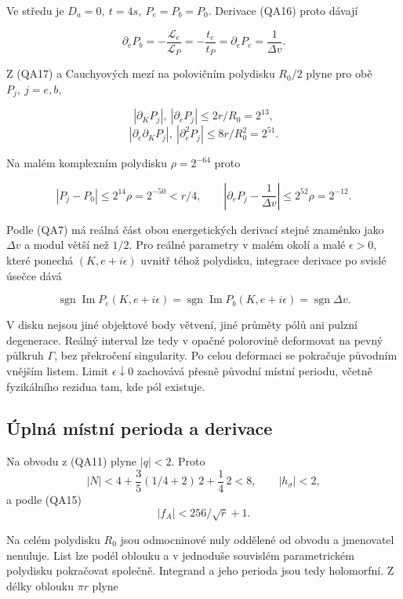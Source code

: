 \documentclass[11pt,a4paper]{article}
\theoremstyle{remark}\newtheorem{remark}[theorem]{Poznámka}
\numberwithin{equation}{section}
\begin{document}
Ve středu je \(D_a=0,\ t=4s,\ P_e=P_b=P_0\). Derivace (QA16) proto
dávají

\[
\partial_eP_b=-\frac{\mathcal L_e}{\mathcal L_P}
=-\frac{t_e}{t_P}
=\partial_eP_e=\frac1{\Delta v}.
\tag{QA19}
\]

Z (QA17) a Cauchyových mezí na polovičním polydisku \(R_0/2\) plyne pro
obě \(P_j,\ j=e,b\),

\[
|\partial_KP_j|,\ |\partial_eP_j|\le2r/R_0=2^{13},
\] \[
|\partial_e\partial_KP_j|,\ |\partial_e^2P_j|
\le8r/R_0^2=2^{51}.
\tag{QA20}
\]

Na malém komplexním polydisku \(\rho=2^{-64}\) proto

\[
|P_j-P_0|\le2^{14}\rho=2^{-50}<r/4,\qquad
\left|\partial_eP_j-\frac1{\Delta v}\right|
\le2^{52}\rho=2^{-12}.
\tag{QA21}
\]

Podle (QA7) má reálná část obou energetických derivací stejné znaménko
jako \(\Delta v\) a modul větší než \(1/2\). Pro reálné parametry v
malém okolí a malé \(\epsilon>0\), které ponechá \((K,e+i\epsilon)\)
uvnitř téhož polydisku, integrace derivace po svislé úsečce dává

\[
\boxed{
\operatorname{sgn}\operatorname{Im}P_e(K,e+i\epsilon)
=\operatorname{sgn}\operatorname{Im}P_b(K,e+i\epsilon)
=\operatorname{sgn}\Delta v.
}
\tag{QA22}
\]

V disku nejsou jiné objektové body větvení, jiné průměty pólů ani pulzní
degenerace. Reálný interval lze tedy v opačné polorovině deformovat na
pevný půlkruh \(\Gamma\), bez překročení singularity. Po celou deformaci
se pokračuje původním vnějším listem. Limit \(\epsilon\downarrow0\)
zachovává přesně původní místní periodu, včetně fyzikálního rezidua tam,
kde pól existuje.

\hypertarget{uxfaplnuxe1-muxedstnuxed-perioda-a-derivace}{%
\subsection{Úplná místní perioda a
derivace}\label{uxfaplnuxe1-muxedstnuxed-perioda-a-derivace}}

Na obvodu z (QA11) plyne \(|q|<2\). Proto \[
|N|<4+\frac35(1/4+2)\,2+\frac14\,2<8,\qquad |h_\sigma|<2,
\] a podle (QA15) \[
|f_A|<256/\sqrt r+1.
\]

Na celém polydisku \(R_0\) jsou odmocninové nuly oddělené od obvodu a
jmenovatel nenuluje. List lze podél oblouku a v jednoduše souvislém
parametrickém polydisku pokračovat společně. Integrand a jeho perioda
jsou tedy holomorfní. Z délky oblouku \(\pi r\) plyne
\end{document}
